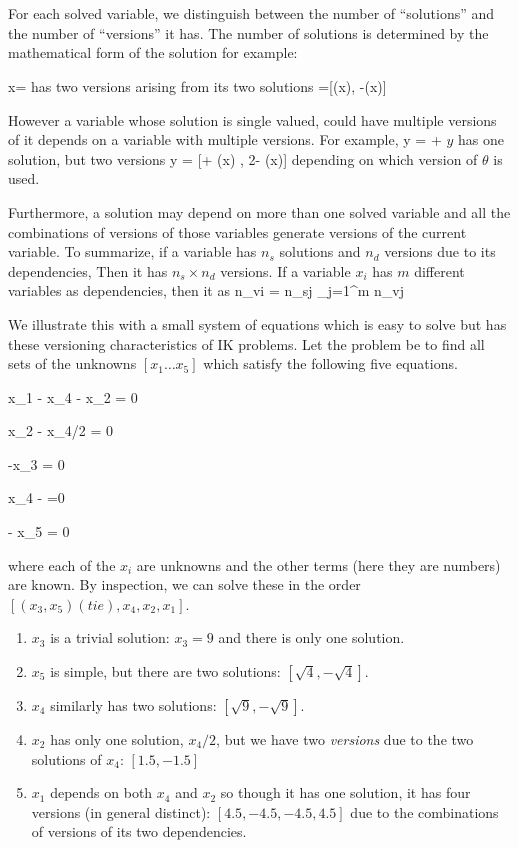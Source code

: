 \documentclass[letterpaper]{article}
\begin{document}
\section{}

For each solved variable, we distinguish between the number of ``solutions” and the number of
``versions” it has.  The number of solutions is determined by the mathematical form of the
solution for example:

\beq
x=\sin{(\theta)}
\eeq
\noindent
has two versions arising from its two solutions
\beq
\theta =[\arctan(x), \pi-\arctan(x)]
\eeq

However a variable whose solution is single valued, could have multiple versions of it depends on a variable with multiple versions.  For example,
\beq
y = \theta + \pi
\eeq
\noindent
$y$ has one solution, but two versions
\beq
y = [\pi + \arctan(x) , 2\pi - \arctan(x)]
\eeq
depending on which version of $ \theta$ is used.

Furthermore, a solution may depend on more than one solved variable and all the combinations of versions of those variables generate  versions of the current variable.
To summarize, if a variable has $n_s$ solutions and $n_d$ versions due to  its dependencies,
Then it has $n_s \times n_d$ versions.  If a variable $x_i$ has $m$ different variables as dependencies, then
it as
\beq\label{VersionProductEqn}
n_{vi} = n_{sj} \Pi_{j=1}^{m} n_{vj}
\eeq


We illustrate this with  a small system of equations which is easy to solve but has these
versioning characteristics
of IK problems.
Let the problem  be to find all sets of the unknowns $[x_1 \dots x_5]$ which satisfy the following five equations.

\beq\label{X1Eqn}
x_1 - x_4 - x_2 = 0
\eeq

\beq
x_2 - x_4/2 = 0
\eeq

-x_3 = 0
\eeq

\beq\label{X4Eqn}
x_4 -  =0
\eeq

\beq\label{X5Eqn}
 - x_5 = 0
\eeq

where each of the $x_i$ are unknowns and the other terms (here they are numbers) are known.
By inspection, we can solve these in the order  $[(x_3, x_5)(tie), x_4, x_2, x_1 ]$.

\begin{enumerate}
\item $x_3$ is a trivial solution: $x_3=9$ and there is only one solution.
\item $x_5$ is simple, but there are two solutions: $[\sqrt{4}, -\sqrt{4}]$.
\item $x_4$ similarly has two solutions:  $[\sqrt{9}, -\sqrt{9}]$.
\item $x_2$ has only one solution, $x_4/2$, but we have two {\it versions} due
to the two solutions of $x_4$: $[1.5,-1.5]$
\item $x_1$ depends on both $x_4$ and $x_2$ so though it has one solution, it
has four versions (in general distinct): $[4.5, -4.5, -4.5, 4.5]$ due to the
combinations of versions of its two dependencies.
\end{enumerate}
\end{document}
